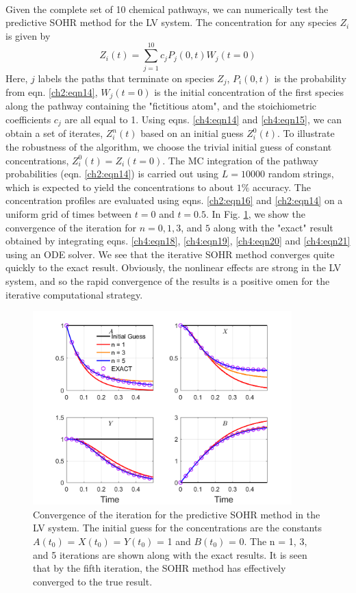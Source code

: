 \paragraph{}
Given the complete set of 10 chemical pathways, we can
numerically test the predictive SOHR method for the LV
system. The concentration for any species $Z_i$ is given by 
\[
Z_i(t) = \sum_{j=1}^{10}{c_jP_j(0,t)W_j(t=0)}
\]
Here, $j$ labels the paths that
terminate on species $Z_j$, $P_i(0,t)$ is the probability from eqn. \ref{ch2:eqn14},
$W_j(t = 0)$ is the initial concentration of the first species along
the pathway containing the "fictitious atom", and the
stoichiometric coefficients $c_j$ are all equal to 1. Using eqns. \ref{ch4:eqn14}
and \ref{ch4:eqn15}, we can obtain a set of iterates, $Z_i^n(t)$ based on an initial
guess $Z_i^0(t)$. To illustrate the robustness of the algorithm, we
choose the trivial initial guess of constant concentrations, $Z_i^0(t)= Z_i(t = 0)$. The MC integration of the pathway probabilities
(eqn. \ref{ch2:eqn14}) is carried out using $L = 10 000$ random strings, which is
expected to yield the concentrations to about $1\%$ accuracy. The
concentration profiles are evaluated using eqns. \ref{ch2:eqn16} and \ref{ch2:eqn14} on a
uniform grid of times between $t = 0$ and $t = 0.5$. In Fig. \ref{ch4:fig:3}, we
show the convergence of the iteration for $n = 0, 1, 3$, and $5$
along with the "exact" result obtained by integrating eqns. \ref{ch4:eqn18}, \ref{ch4:eqn19}, \ref{ch4:eqn20} and \ref{ch4:eqn21}
using an ODE solver. We see that the iterative SOHR method
converges quite quickly to the exact result. Obviously, the
nonlinear effects are strong in the LV system, and so the rapid
convergence of the results is a positive omen for the iterative
computational strategy.
\begin{figure}[htbp]
	\caption[Convergence of the iteration for the predictive SOHR method in the LV system]
	{Convergence of the iteration for the predictive SOHR
method in the LV system. The initial guess for the concentrations are
the constants $A(t_0)$ = $X(t_0)$ = $Y(t_0)$ = 1 and $B(t_0)$ = 0. The n = 1, 3,
and 5 iterations are shown along with the exact results. It is seen that
by the fifth iteration, the SOHR method has effectively converged to
the true result.}
    \begin{center}
	\includegraphics[width=100mm]{figs/chapter4/fig3.png}
    \end{center}
\label{ch4:fig:3}
\end{figure}
